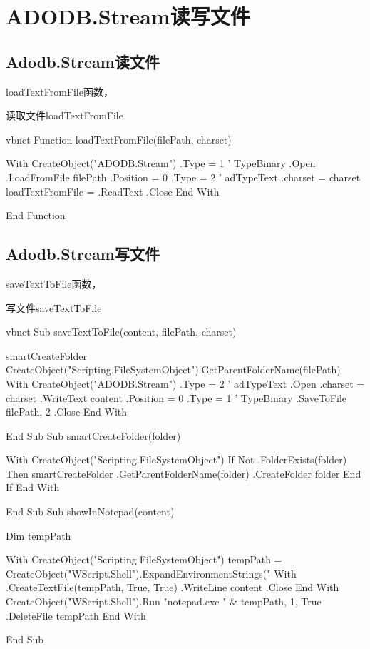 \section{ADODB.Stream读写文件}
\subsection{Adodb.Stream读文件}
loadTextFromFile函数，
\begin{codebox}{读取文件}{loadTextFromFile}
	\begin{amzcode}{vbnet}
		Function loadTextFromFile(filePath, charset)
		
			With CreateObject("ADODB.Stream")
				.Type = 1 ' TypeBinary
				.Open
				.LoadFromFile filePath
				.Position = 0
				.Type = 2 ' adTypeText
				.charset = charset
				loadTextFromFile = .ReadText
				.Close
			End With
		
		End Function
	\end{amzcode}
\end{codebox}
\subsection{Adodb.Stream写文件}
saveTextToFile函数，
\begin{codebox}{写文件}{saveTextToFile}
	\begin{amzcode}{vbnet}
		Sub saveTextToFile(content, filePath, charset)
		
			smartCreateFolder CreateObject("Scripting.FileSystemObject").GetParentFolderName(filePath)
				With CreateObject("ADODB.Stream")
					.Type = 2 ' adTypeText
					.Open
					.charset = charset
					.WriteText content
					.Position = 0
					.Type = 1 ' TypeBinary
					.SaveToFile filePath, 2
					.Close
				End With
			
		End Sub
		Sub smartCreateFolder(folder)
		
			With CreateObject("Scripting.FileSystemObject")
				If Not .FolderExists(folder) Then
					smartCreateFolder .GetParentFolderName(folder)
					.CreateFolder folder
				End If
			End With
		
		End Sub
		Sub showInNotepad(content)
		
			Dim tempPath
			
			With CreateObject("Scripting.FileSystemObject")
				tempPath = CreateObject("WScript.Shell").ExpandEnvironmentStrings("%
				With .CreateTextFile(tempPath, True, True)
					.WriteLine content
					.Close
				End With
				CreateObject("WScript.Shell").Run "notepad.exe " & tempPath, 1, True
				.DeleteFile tempPath
			End With
		
		End Sub
	\end{amzcode}
\end{codebox}


